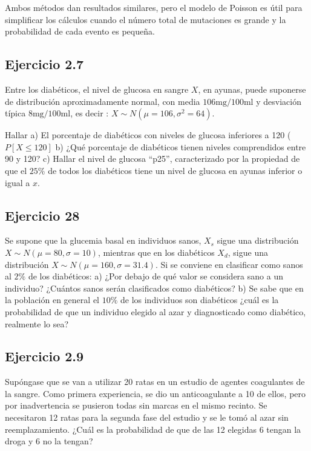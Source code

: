 \documentclass[
]{article}
\begin{document}
Ambos métodos dan resultados similares, pero el modelo de Poisson es útil para simplificar los cálculos cuando el número total de mutaciones es grande y la probabilidad de cada evento es pequeña.

\subsection{Ejercicio 2.7}\label{ejercicio-2.7}

Entre los diabéticos, el nivel de glucosa en sangre \(X\), en ayunas, puede suponerse de distribución aproximadamente normal, con media \(106 \mathrm{mg} / 100 \mathrm{ml}\) y desviación típica \(8 \mathrm{mg} / 100 \mathrm{ml}\), es decir : \(X \sim N\left(\mu=106, \sigma^{2}=64\right)\).

Hallar
a) El porcentaje de diabéticos con niveles de glucosa inferiores a 120 ( \(P[X \leq 120]\)
b) ¿Qué porcentaje de diabéticos tienen niveles comprendidos entre 90 y 120?
c) Hallar el nivel de glucosa ``p25'', caracterizado por la propiedad de que el \(25 \%\) de todos los diabéticos tiene un nivel de glucosa en ayunas inferior o igual a \(x\).

\subsection{Ejercicio 28}\label{ejercicio-28}

Se supone que la glucemia basal en individuos sanos, \(X_{s}\) sigue una distribución \(X \sim N(\mu=80, \sigma=10)\), mientras que en los diabéticos \(X_{d}\), sigue una distribución \(X \sim N(\mu=160, \sigma=31.4)\). Si se conviene en clasificar como sanos al \(2 \%\) de los diabéticos:
a) ¿Por debajo de qué valor se considera sano a un individuo? ¿Cuántos sanos serán clasificados como diabéticos?
b) Se sabe que en la población en general el \(10 \%\) de los individuos son diabéticos ¿cuál es la probabilidad de que un individuo elegido al azar y diagnosticado como diabético, realmente lo sea?

\subsection{Ejercicio 2.9}\label{ejercicio-2.9}

Supóngase que se van a utilizar 20 ratas en un estudio de agentes coagulantes de la sangre. Como primera experiencia, se dio un anticoagulante a 10 de ellos, pero por inadvertencia se pusieron todas sin marcas en el mismo recinto. Se necesitaron 12 ratas para la segunda fase del estudio y se le tomó al azar sin reemplazamiento. ¿Cuál es la probabilidad de que de las 12 elegidas 6 tengan la droga y 6 no la tengan?
\end{document}
